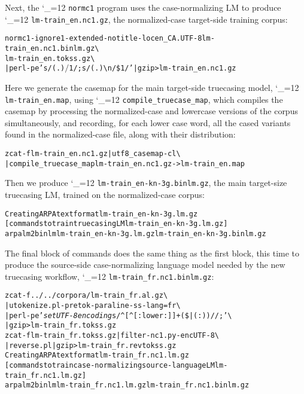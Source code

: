 \documentclass[11pt,letterpaper]{article}
\newcommand{\bs}{\textbackslash{}}
\def\code{\begingroup\catcode`\_=12 \codex}
\newcommand{\codex}[1]{\texttt{#1}\endgroup}
\begin{document}
Next, the \code{normc1} program uses the case-normalizing LM to produce
\code{lm-train_en.nc1.gz}, the nor\-malized-case target-side training corpus:

\begin{small}
\begin{alltt}
   normc1 -ignore 1 -extended -notitle -loc en_CA.UTF-8 lm-train_en.nc1.binlm.gz \bs
        lm-train_en.tokss.gz \bs
        | perl -pe 's/(.)$/$1 /; s/(.){\bs}n/\$1/' | gzip > lm-train_en.nc1.gz
\end{alltt}
\end{small}

Here we generate the casemap for the main target-side truecasing model,
\code{lm-train_en.map}, using \code{compile_truecase_map}, which compiles the
casemap by processing the normalized-case and lowercase versions of the corpus
simultaneously, and recording, for each lower case word, all the cased variants
found in the normalized-case file, along with their distribution:

\begin{small}
\begin{alltt}
   zcat -f lm-train_en.nc1.gz |  utf8_casemap -c l \bs
        | compile_truecase_map lm-train_en.nc1.gz - > lm-train_en.map
\end{alltt}
\end{small}

Then we produce \code{lm-train_en-kn-3g.binlm.gz}, the main target-size
truecasing LM, trained on the normalized-case corpus:

\begin{small}
\begin{alltt}
   Creating ARPA text format lm-train_en-kn-3g.lm.gz
   [commands to train truecasing LM lm-train_en-kn-3g.lm.gz]
   arpalm2binlm lm-train_en-kn-3g.lm.gz lm-train_en-kn-3g.binlm.gz
\end{alltt}
\end{small}

The final block of commands does the same thing as the first block, this time to
produce the source-side case-normalizing language model needed by the new
truecasing workflow, \code{lm-train_fr.nc1.binlm.gz}:

\begin{small}
\begin{alltt}
   zcat -f ../../corpora/lm-train_fr.al.gz \bs
        | utokenize.pl -pretok -paraline -ss -lang=fr \bs
        | perl -pe '\emph{set UTF-8 encoding} s/^[^[:lower:]]+(\$|( : ))//;' \bs
        | gzip > lm-train_fr.tokss.gz
   zcat -f lm-train_fr.tokss.gz | filter-nc1.py -enc UTF-8 \bs
        | reverse.pl | gzip > lm-train_fr.revtokss.gz
   Creating ARPA text format lm-train_fr.nc1.lm.gz
   [commands to train case-normalizing source-language LM lm-train_fr.nc1.lm.gz]
   arpalm2binlm lm-train_fr.nc1.lm.gz lm-train_fr.nc1.binlm.gz
\end{alltt}
\end{small}
\end{document}
